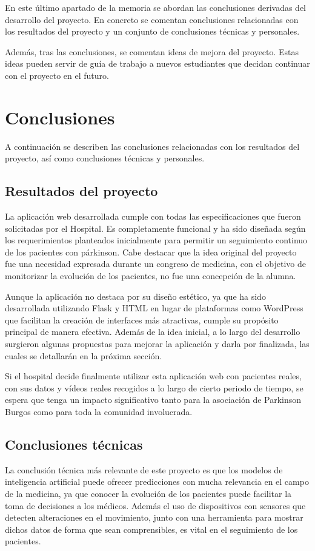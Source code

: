 
En este último apartado de la memoria se abordan las conclusiones derivadas del desarrollo del proyecto. En concreto se comentan conclusiones relacionadas con los resultados del proyecto y un conjunto de conclusiones técnicas y personales. 

Además, tras las conclusiones, se comentan ideas de mejora del proyecto. Estas ideas pueden servir de guía de trabajo a nuevos estudiantes que decidan continuar con el proyecto en el futuro.


\section{Conclusiones}
A continuación se describen las conclusiones relacionadas con los resultados del proyecto, así como conclusiones técnicas y personales. 

\subsection{Resultados del proyecto}
La aplicación web desarrollada cumple con todas las especificaciones que fueron solicitadas por el Hospital. Es completamente funcional y ha sido diseñada según los requerimientos planteados inicialmente para permitir un seguimiento continuo de los pacientes con párkinson. Cabe destacar que la idea original del proyecto fue una necesidad expresada durante un congreso de medicina, con el objetivo de monitorizar la evolución de los pacientes, no fue una concepción de la alumna.

Aunque la aplicación no destaca por su diseño estético, ya que ha sido desarrollada utilizando Flask y HTML en lugar de plataformas como WordPress que facilitan la creación de interfaces más atractivas, cumple su propósito principal de manera efectiva. Además de la idea inicial, a lo largo del desarrollo surgieron algunas propuestas para mejorar la aplicación y darla por finalizada, las cuales se detallarán en la próxima sección.

Si el hospital decide finalmente utilizar esta aplicación web con pacientes reales, con sus datos y vídeos reales recogidos a lo largo de cierto periodo de tiempo, se espera que tenga un impacto significativo tanto para la asociación de Parkinson Burgos como para toda la comunidad involucrada.


\subsection{Conclusiones técnicas}
La conclusión técnica más relevante de este proyecto es que los modelos de inteligencia artificial puede ofrecer predicciones con mucha relevancia en el campo de la medicina, ya que conocer la evolución de los pacientes puede facilitar la toma de decisiones a los médicos. Además el uso de dispositivos con sensores que detecten alteraciones en el movimiento, junto con una herramienta para mostrar dichos datos de forma que sean comprensibles, es vital en el seguimiento de los pacientes.

